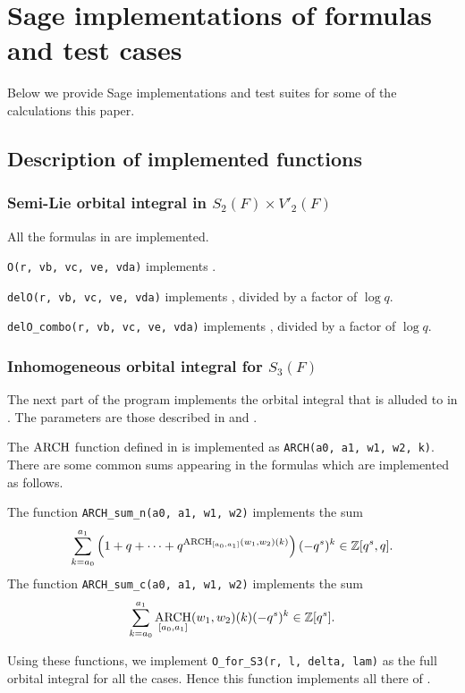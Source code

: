 \chapter{Sage implementations of formulas and test cases}
Below we provide Sage implementations and test suites
for some of the calculations this paper.

\section{Description of implemented functions}
\subsection{Semi-Lie orbital integral in $S_2(F) \times V'_2(F)$}
All the formulas in  are implemented.
\begin{itemize}
  \ii \texttt{O(r, vb, vc, ve, vda)}
  implements .

  \ii \texttt{delO(r, vb, vc, ve, vda)}
  implements ,
  divided by a factor of $\log q$.

  \ii \texttt{delO\_combo(r, vb, vc, ve, vda)}
  implements ,
  divided by a factor of $\log q$.
\end{itemize}

\subsection{Inhomogeneous orbital integral for $S_3(F)$}
The next part of the program implements the orbital integral
that is alluded to in .
The parameters are those described in  and .
\begin{itemize}
  \ii The $\operatorname*{ARCH}$ function defined in  is implemented
  as \texttt{ARCH(a0, a1, w1, w2, k)}.
  \ii There are some common sums appearing in the formulas
  which are implemented as follows.
  \begin{itemize}
    \ii The function \texttt{ARCH\_sum\_n(a0, a1, w1, w2)} implements the sum
    \[ \sum_{k=a_0}^{a_1} \left( 1 + q + \dots
      + q^{\operatorname*{ARCH}_{[a_0, a_1]}(w_1, w_2)(k)} \right) (-q^s)^k \in \mathbb Z[q^s, q]. \]
    \ii The function \texttt{ARCH\_sum\_c(a0, a1, w1, w2)} implements the sum
    \[ \sum_{k=a_0}^{a_1} \operatorname*{ARCH}_{[a_0, a_1]}(w_1, w_2)(k) (-q^s)^k \in \mathbb Z[q^s]. \]
  \end{itemize}
  \ii Using these functions, we implement \texttt{O\_for\_S3(r, l, delta, lam)}
  as the full orbital integral for all the cases.
  Hence this function implements all there of
  .
\end{itemize}


